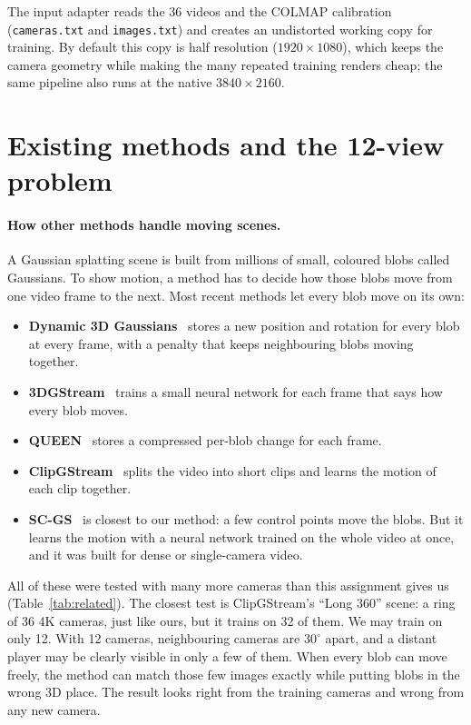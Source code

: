 \documentclass[11pt]{article}
\begin{document}
The input adapter reads the 36 videos and the COLMAP calibration (\texttt{cameras.txt} and
\texttt{images.txt}) and creates an undistorted working copy for training. By default this copy is
half resolution ($1920\times1080$), which keeps the camera geometry while making the many repeated
training renders cheap; the same pipeline also runs at the native $3840\times2160$.

\section{Existing methods and the 12-view problem}\label{sec:related}
\paragraph{How other methods handle moving scenes.}
A Gaussian splatting scene is built from millions of small, coloured blobs called Gaussians. To show
motion, a method has to decide how those blobs move from one video frame to the next. Most recent
methods let every blob move on its own:
\begin{itemize}
\item \textbf{Dynamic 3D Gaussians}~\cite{luiten2024dynamic} stores a new position and rotation for
every blob at every frame, with a penalty that keeps neighbouring blobs moving together.
\item \textbf{3DGStream}~\cite{sun2024_3dgstream} trains a small neural network for each frame that
says how every blob moves.
\item \textbf{QUEEN}~\cite{girish2024queen} stores a compressed per-blob change for each frame.
\item \textbf{ClipGStream}~\cite{liang2026clipgstream} splits the video into short clips and learns
the motion of each clip together.
\item \textbf{SC-GS}~\cite{huang2024scgs} is closest to our method: a few control points move the
blobs. But it learns the motion with a neural network trained on the whole video at once, and it
was built for dense or single-camera video.
\end{itemize}

All of these were tested with many more cameras than this assignment gives us
(Table~\ref{tab:related}). The closest test is ClipGStream's ``Long 360'' scene: a ring of 36 4K
cameras, just like ours, but it trains on 32 of them. We may train on only 12. With 12 cameras,
neighbouring cameras are $30^\circ$ apart, and a distant player may be clearly visible in only a
few of them. When every blob can move freely, the method can match those few images exactly while
putting blobs in the wrong 3D place. The result looks right from the training cameras and wrong
from any new camera.
\end{document}
